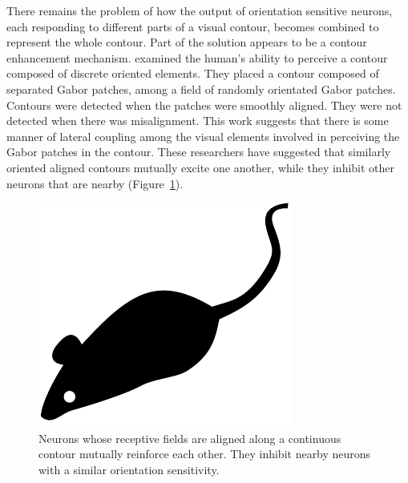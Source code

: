 \documentclass[prodmode,acmtap]{acmlarge}
\begin{document}
There remains the problem of how the output of orientation sensitive
neurons, each responding to different parts of a visual contour,
becomes combined to represent the whole contour. Part of the solution
appears to be a contour enhancement mechanism. 
examined the human's ability to perceive a contour composed of
discrete oriented elements. They placed a contour composed of
separated Gabor patches, among a field of randomly orientated Gabor
patches. Contours were detected when the patches were smoothly
aligned. They were not detected when there was misalignment. This
work suggests that there is some manner of lateral coupling among the
visual elements involved in perceiving the Gabor patches in the
contour. These researchers have suggested that similarly oriented
aligned contours mutually excite one another, while they inhibit
other neurons that are nearby (Figure~\ref{neuronalignmentfig}).

\begin{figure}[tp]
\centering
\includegraphics{acmlarge-mouse}
\caption{Neurons whose receptive fields are aligned along a
continuous contour mutually reinforce each other. They inhibit nearby
neurons with a similar orientation sensitivity.}
\label{neuronalignmentfig}
\end{figure}
\end{document}
